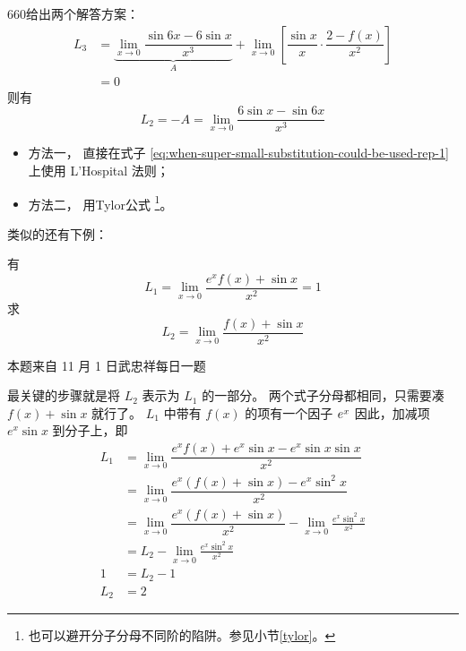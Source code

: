 \begin{example}
    660给出两个解答方案：
    \begin{align*}
        L_3 &= \underbrace{\lim_{x \to 0} \dfrac{\sin 6x - 6 \sin x}{x^3}}_{A} + 
               \lim_{x \to 0} \left[\dfrac{\sin x}{x} \cdot \dfrac{2 - f(x)}{x^2}\right] \\
            &= 0
    \end{align*}
    则有
    \begin{equation}
        \label{eq:when-super-small-substitution-could-be-used-rep-1}
        L_2 = -A = \lim_{x \to 0} \dfrac{6 \sin x - \sin 6x}{x^3}
    \end{equation}
    \begin{itemize}
        \item 方法一，
            直接在式子
            \ref{eq:when-super-small-substitution-could-be-used-rep-1} 
            上使用 L'Hospital 法则；
        \item 方法二，
            用Tylor公式
            \footnote{也可以避开分子分母不同阶的陷阱。参见小节\ref{tylor}。}。
    \end{itemize}
\end{example}

类似的还有下例：
\begin{example}
    有
    \[
        L_1 = \lim_{x \to 0} \dfrac{e^x f(x) + \sin x}{x^2} = 1
    \]
    求
    \[
        L_2 = \lim_{x \to 0} \dfrac{f(x) + \sin x}{x^2}
    \]

    本题来自 11 月 1 日武忠祥每日一题 

    最关键的步骤就是将 $L_2$ 表示为 $L_1$ 的一部分。
    两个式子分母都相同，只需要凑 $f(x) + \sin x$ 就行了。
    $L_1$ 中带有 $f(x)$ 的项有一个因子 $\cramped{e^x}$
    因此，加减项 $e^x \sin x$ 到分子上，即
    \begin{align*}
        L_1 &= \lim_{x \to 0} \dfrac{e^x f(x) + e^x \sin x - e^x \sin x \sin x}{x^2} \\
            &= \lim_{x \to 0} \dfrac{e^x \left(f(x) + \sin x\right) - e^x \sin^2 x }{x^2} \\
            &= \lim_{x \to 0} \dfrac{e^x \left(f(x) + \sin x\right)}{x^2} 
                - \lim_{x \to 0} \frac{e^x \sin^2 x }{x^2} \\
            &= L_2 - \lim_{x \to 0} \frac{e^x \sin^2 x }{x^2} \\
          1 &= L_2 - 1 \\
        L_2 &= 2
    \end{align*}
\end{example}

